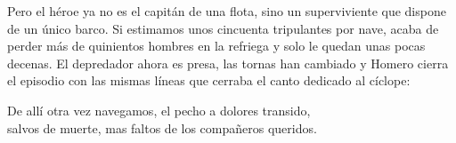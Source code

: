 Pero el héroe ya no es el capitán de una flota, sino un superviviente que dispone de un único barco. Si estimamos unos cincuenta tripulantes por nave, acaba de perder más de quinientos hombres en la refriega y solo le quedan unas pocas decenas. El depredador ahora es presa, las tornas han cambiado y Homero cierra el episodio con las mismas líneas que cerraba el canto dedicado al cíclope:

\begin{versocita}
De allí otra vez navegamos, el pecho a dolores transido,\\
salvos de muerte, mas faltos de los compañeros queridos.
\end{versocita}
